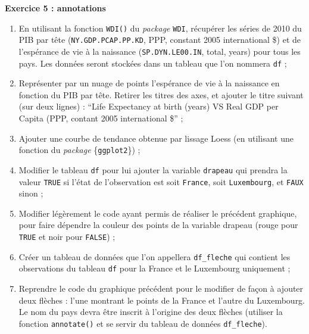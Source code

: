 \documentclass[
  11pt,
]{book}
\makeatletter
\numberwithin{equation}{section}
\numberwithin{countremarque}{section}
\newenvironment{exframe}{%
 \def\at@end@of@exframe{}%
 \ifinner\ifhmode%
  \def\at@end@of@exframe{\end{minipage}}%
  \begin{minipage}{\columnwidth}%
 \fi\fi%
 \def\FrameCommand##1{\hskip\@totalleftmargin \hskip-\fboxsep
 \colorbox{shadecolorex}{##1}\hskip-\fboxsep
     \hskip-\linewidth \hskip-\@totalleftmargin \hskip\columnwidth}%
 \MakeFramed {\advance\hsize-\width
   \@totalleftmargin\z@ \linewidth\hsize
   \@setminipage}}%
 {\par\unskip\endMakeFramed%
 \at@end@of@exframe}
\makeatother
\begin{document}
\begin{exframe}
\textbf{Exercice 5 : annotations}

\begin{enumerate}
\def\labelenumi{\arabic{enumi}.}
\item
  En utilisant la fonction \texttt{WDI()} du \emph{package} \texttt{WDI}, récupérer les séries de 2010 du PIB par tête (\texttt{NY.GDP.PCAP.PP.KD}, PPP, constant 2005 international \$) et de l'espérance de vie à la naissance (\texttt{SP.DYN.LE00.IN}, total, years) pour tous les pays. Les données seront stockées dans un tableau que l'on nommera \texttt{df} ;
\item
  Représenter par un nuage de points l'espérance de vie à la naissance en fonction du PIB par tête. Retirer les titres des axes, et ajouter le titre suivant (sur deux lignes) : ``Life Expectancy at birth (years) VS Real GDP per Capita (PPP, contant 2005 international \$'' ;
\item
  Ajouter une courbe de tendance obtenue par lissage Loess (en utilisant une fonction du \emph{package} \{\texttt{ggplot2}\}) ;
\item
  Modifier le tableau \texttt{df} pour lui ajouter la variable \texttt{drapeau} qui prendra la valeur \texttt{TRUE} si l'état de l'observation est soit \texttt{France}, soit \texttt{Luxembourg}, et \texttt{FAUX} sinon ;
\item
  Modifier légèrement le code ayant permis de réaliser le précédent graphique, pour faire dépendre la couleur des points de la variable drapeau (rouge pour \texttt{TRUE} et noir pour \texttt{FALSE}) ;
\item
  Créer un tableau de données que l'on appellera \texttt{df\_fleche} qui contient les observations du tableau \texttt{df} pour la France et le Luxembourg uniquement ;
\item
  Reprendre le code du graphique précédent pour le modifier de façon à ajouter deux flèches : l'une montrant le points de la France et l'autre du Luxembourg. Le nom du pays devra être inscrit à l'origine des deux flèches (utiliser la fonction \texttt{annotate()} et se servir du tableau de données \texttt{df\_fleche}).
\end{enumerate}
\end{exframe}
\end{document}
